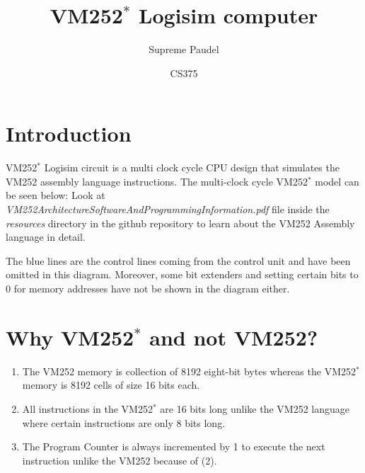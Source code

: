 \documentclass{article}
\title{VM252$^*$ Logisim computer}
\author{Supreme Paudel}
\date{CS375}
\begin{document}
\maketitle

\tableofcontents
\section{Introduction}
VM252$^*$ Logisim circuit is a multi clock cycle CPU design that simulates the VM252 assembly language instructions. \newline
The multi-clock cycle VM252$^*$ model can be seen below:\newline
\newline
{\small Look at \textit{VM252ArchitectureSoftwareAndProgrammingInformation.pdf}
file inside the \textit{resources} directory in the github repository to learn about the VM252 Assembly language in detail. }


The blue lines are the control lines coming from the control unit and have been omitted in this diagram. Moreover, some bit extenders and setting certain bits to 0 for memory addresses have not be shown in the diagram either.

\section{Why VM252$^*$ and not VM252?}

    \begin{enumerate}
        \item The VM252 memory is collection of 8192 eight-bit bytes whereas the VM252$^*$ memory is 8192 cells of size 16 bits each.
        \item All instructions in the VM252$^*$ are 16 bits long unlike the VM252 language where certain instructions are only 8 bits long.
        \item The Program Counter is always incremented by 1 to execute the next instruction unlike the VM252 because of (2).
    \end{enumerate}
\end{document}
